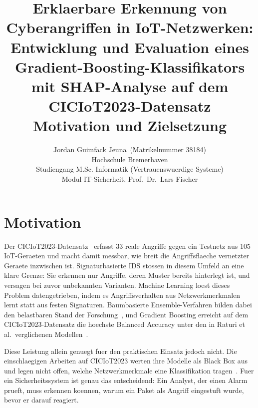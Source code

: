 \documentclass[letterpaper,twocolumn,10pt]{article}
\newcommand{\ba}{Balanced Accuracy}
\newcommand{\gb}{Gradient Boosting}
\newcommand{\iot}{IoT}
\newcommand{\ids}{IDS}
\begin{document}
\date{}

\title{\Large \bf
  Erklaerbare Erkennung von Cyberangriffen in IoT-Netzwerken:\\
  Entwicklung und Evaluation eines Gradient-Boosting-Klassifikators\\
  mit SHAP-Analyse auf dem CICIoT2023-Datensatz\\[6pt]
  \large Motivation und Zielsetzung
}

\author{
  {\rm Jordan Guimfack Jeuna}\ (Matrikelnummer 38184)\\
  Hochschule Bremerhaven\\
  Studiengang M.Sc. Informatik (Vertrauenswuerdige Systeme)\\
  Modul IT-Sicherheit, Prof.\ Dr.\ Lars Fischer
}

\maketitle

\section{Motivation}\label{motivation}

Der CICIoT2023-Datensatz~\cite{neto2023ciciot2023} erfasst 33 reale Angriffe gegen
ein Testnetz aus 105 \iot{}-Geraeten und macht damit messbar, wie breit die
Angriffsflaeche vernetzter Geraete inzwischen ist.
Signaturbasierte \ids{} stossen in diesem Umfeld an eine klare Grenze: Sie erkennen
nur Angriffe, deren Muster bereits hinterlegt ist, und versagen bei zuvor unbekannten
Varianten.
Machine Learning loest dieses Problem datengetrieben, indem es Angriffsverhalten aus
Netzwerkmerkmalen lernt statt aus festen Signaturen.
Baumbasierte Ensemble-Verfahren bilden dabei den belastbaren Stand der
Forschung~\cite{kikissagbe2024review}, und \gb{} erreicht auf dem CICIoT2023-Datensatz
die hoechste \ba{} unter den in Raturi et al.\ verglichenen
Modellen~\cite{raturi2026exploratory}.

Diese Leistung allein genuegt fuer den praktischen Einsatz jedoch nicht.
Die einschlaegigen Arbeiten auf CICIoT2023 werten ihre Modelle als Black Box aus und
legen nicht offen, welche Netzwerkmerkmale eine Klassifikation
tragen~\cite{raturi2026exploratory,almahaqeri2026gradient}.
Fuer ein Sicherheitssystem ist genau das entscheidend: Ein Analyst, der einen Alarm
prueft, muss erkennen koennen, warum ein Paket als Angriff eingestuft wurde, bevor er
darauf reagiert.
\end{document}
